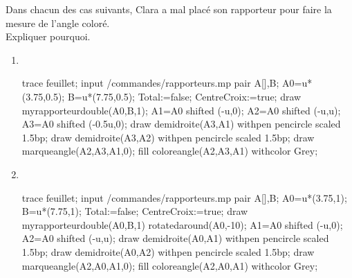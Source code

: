 \begin{exercice*}
    Dans chacun des cas suivants, Clara a mal placé son rapporteur pour faire la mesure de l'angle coloré.\\
    Expliquer pourquoi.

    \begin{enumerate}
        \item \phantom{rrr}\\
        \begin{Geometrie}[CoinHD={(7.5u,4.5u)}]
            trace feuillet;
            input \persopath/commandes/rapporteurs.mp
            pair A[],B;
            A0=u*(3.75,0.5);
            B=u*(7.75,0.5);
            Total:=false;%
            CentreCroix:=true;%
            draw myrapporteurdouble(A0,B,1);        
            A1=A0 shifted (-u,0); 
            A2=A0 shifted (-u,u);
            A3=A0 shifted (-0.5u,0);
            draw demidroite(A3,A1) withpen pencircle scaled 1.5bp;
            draw demidroite(A3,A2) withpen pencircle scaled 1.5bp;
            draw marqueangle(A2,A3,A1,0);
            fill coloreangle(A2,A3,A1) withcolor Grey;
        \end{Geometrie}
        \par\vspace*{4mm}\dotfill
        \par\vspace*{4mm}\dotfill
        \par\vspace*{4mm}\dotfill
        \par\vspace*{4mm}\dotfill
        \item \phantom{rrr}\\
        \begin{Geometrie}[CoinHD={(7.5u,4.5u)}]
            trace feuillet;
            input \persopath/commandes/rapporteurs.mp
            pair A[],B;
            A0=u*(3.75,1);
            B=u*(7.75,1);
            Total:=false;%
            CentreCroix:=true;%
            draw myrapporteurdouble(A0,B,1) rotatedaround(A0,-10);
            A1=A0 shifted (-u,0); 
            A2=A0 shifted (-u,u);
            draw demidroite(A0,A1) withpen pencircle scaled 1.5bp;
            draw demidroite(A0,A2) withpen pencircle scaled 1.5bp;
            draw marqueangle(A2,A0,A1,0);
            fill coloreangle(A2,A0,A1) withcolor Grey;
        \end{Geometrie}
        \par\vspace*{4mm}\dotfill
        \par\vspace*{4mm}\dotfill
        \par\vspace*{4mm}\dotfill
        \par\vspace*{4mm}\dotfill
        \par\vspace*{4mm}\dotfill
    \end{enumerate}
\end{exercice*}

